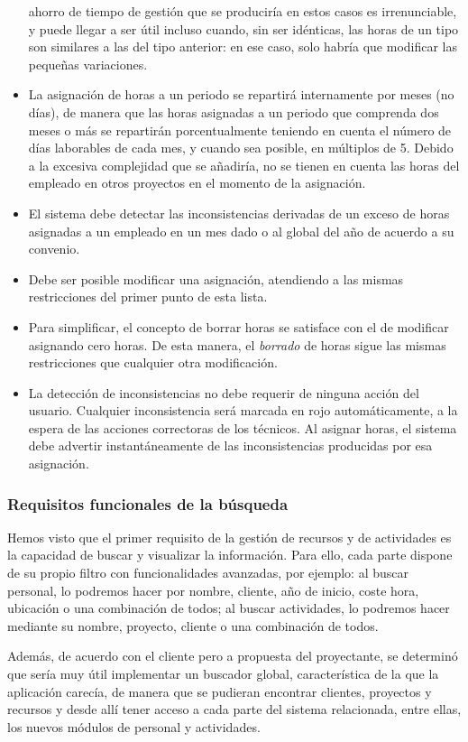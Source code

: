 \begin{itemize}
ahorro de tiempo de gestión que se produciría en estos casos es irrenunciable,
y puede llegar a ser útil incluso cuando, sin ser idénticas, las horas de un
tipo son similares a las del tipo anterior: en ese caso, solo habría que
modificar las pequeñas variaciones.
 \item La asignación de horas a un periodo se repartirá internamente por
meses (no días), de manera que las horas asignadas a un periodo que comprenda
dos meses o más se repartirán porcentualmente teniendo en cuenta el número de
días laborables de cada mes, y cuando sea posible, en múltiplos de 5. Debido a
la excesiva complejidad que se añadiría, no se tienen en cuenta las horas del
empleado en otros proyectos en el momento de la asignación.
 \item El sistema debe detectar las inconsistencias derivadas de un exceso de
horas asignadas a un empleado en un mes dado o al global del año de acuerdo a
su convenio.
 \item Debe ser posible modificar una asignación, atendiendo a las mismas
restricciones del primer punto de esta lista.
 \item Para simplificar, el concepto de borrar horas se satisface con el de
modificar asignando cero horas. De esta manera, el \textit{borrado} de horas
sigue las mismas restricciones que cualquier otra modificación.
 \item La detección de inconsistencias no debe requerir de ninguna acción del
usuario. Cualquier inconsistencia será marcada en rojo automáticamente, a la
espera de las acciones correctoras de los técnicos. Al asignar horas, el
sistema debe advertir instantáneamente de las inconsistencias producidas por
esa asignación.
\end{itemize}

\subsubsection{Requisitos funcionales de la búsqueda}

Hemos visto que el primer requisito de la gestión de recursos y de actividades
es la capacidad de buscar y visualizar la información. Para ello, cada parte
dispone de su propio filtro con funcionalidades avanzadas, por ejemplo: al
buscar personal, lo podremos hacer por nombre, cliente, año de inicio, coste
hora, ubicación o una combinación de todos; al buscar actividades, lo podremos
hacer mediante su nombre, proyecto, cliente o una combinación de todos.

Además, de acuerdo con el cliente pero a propuesta del proyectante, se
determinó que sería muy útil implementar un buscador global, característica de
la que la aplicación carecía, de manera que se pudieran encontrar clientes,
proyectos y recursos y desde allí tener acceso
a cada parte del sistema relacionada, entre ellas, los nuevos módulos de
personal y actividades.

